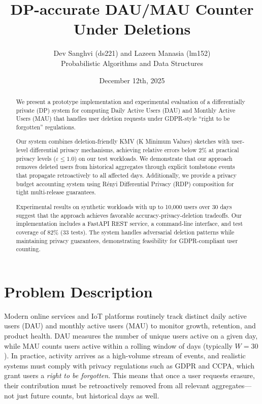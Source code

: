 \documentclass[11pt]{article}
\title{DP-accurate DAU/MAU Counter Under Deletions}
\author{Dev Sanghvi (ds221) and Lazeen Manasia (lm152) \\[0.5ex] 
Probabilistic Algorithms and Data Structures}
\date{December 12th, 2025}
\begin{document}
\maketitle

\begin{abstract}
We present a prototype implementation and experimental evaluation of a differentially private (DP) system for computing Daily Active Users (DAU) and Monthly Active Users (MAU) that handles user deletion requests under GDPR-style ``right to be forgotten'' regulations. 

Our system combines deletion-friendly KMV (K Minimum Values) sketches with user-level differential privacy mechanisms, achieving relative errors below 2\% at practical privacy levels ($\varepsilon \le 1.0$) on our test workloads. We demonstrate that our approach removes deleted users from historical aggregates through explicit tombstone events that propagate retroactively to all affected days. Additionally, we provide a privacy budget accounting system using Rényi Differential Privacy (RDP) composition for tight multi-release guarantees.

Experimental results on synthetic workloads with up to 10,000 users over 30 days suggest that the approach achieves favorable accuracy-privacy-deletion tradeoffs. Our implementation includes a FastAPI REST service, a command-line interface, and test coverage of 82\% (33 tests). The system handles adversarial deletion patterns while maintaining privacy guarantees, demonstrating feasibility for GDPR-compliant user counting.
\end{abstract}


\newpage
\section{Problem Description}

Modern online services and IoT platforms routinely track distinct daily active users (DAU) and monthly active users (MAU) to monitor growth, retention, and product health. DAU measures the number of unique users active on a given day, while MAU counts users active within a rolling window of days (typically $W = 30$). In practice, activity arrives as a high-volume stream of events, and realistic systems must comply with privacy regulations such as GDPR and CCPA, which grant users a \emph{right to be forgotten}. This means that once a user requests erasure, their contribution must be retroactively removed from all relevant aggregates---not just future counts, but historical days as well.
\end{document}
